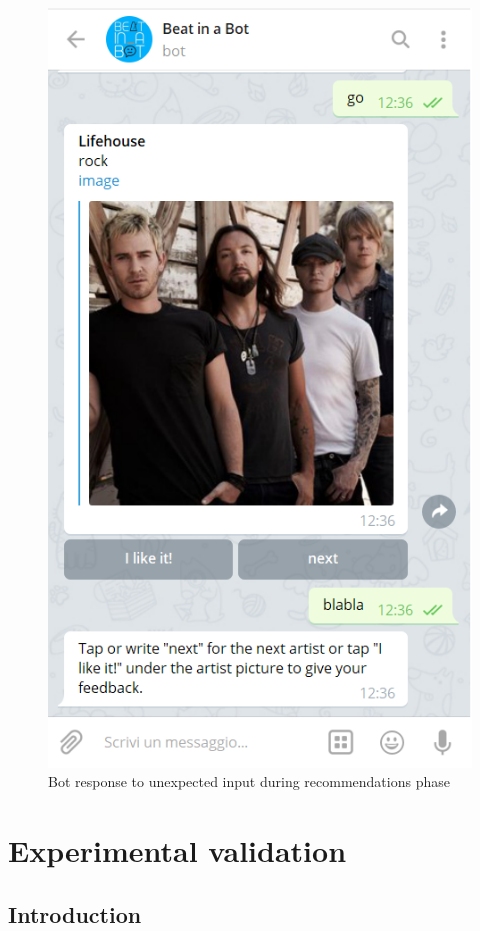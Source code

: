 \documentclass[b5paper,10pt,twoside,cucitura]{toptesi}
\begin{document}
\begin{figure}[ht]
\centering
\includegraphics[scale=0.71]{bot_next_error.png}
\caption{Bot response to unexpected input during recommendations phase}
\end{figure}


\chapter{Experimental validation}
\section{Introduction}
\end{document}
